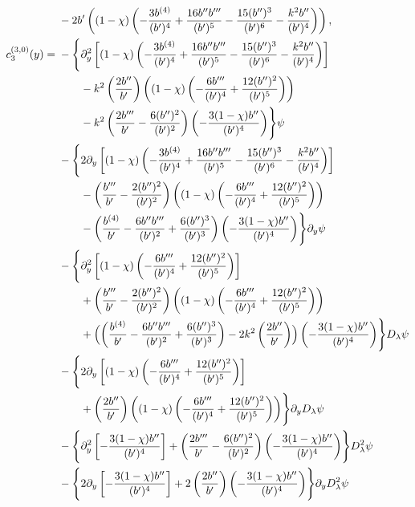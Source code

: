 \documentclass[reqno,11pt]{amsart}
\numberwithin{equation}{section}
\numberwithin{equation}{section} %
\begin{document}
\begin{enumerate}
\begin{align}
 &-2b'\left((1-\chi)\left(-\frac{3b^{(4)}}{(b')^4}+\frac{16b''b'''}{(b')^5}-\frac{15(b'')^3}{(b')^6}-\frac{k^2b''}{(b')^4}\right)\right), \notag\\
 c_3^{(3,0)}(y)
={}&-\Biggl\{\partial_y^2\left[(1-\chi)\left(-\frac{3b^{(4)}}{(b')^4}+\frac{16b''b'''}{(b')^5}-\frac{15(b'')^3}{(b')^6}-\frac{k^2b''}{(b')^4}\right)\right] \notag\\
 &\qquad-k^2\left(\frac{2b''}{b'}\right)\left((1-\chi)\left(-\frac{6b'''}{(b')^4}+\frac{12(b'')^2}{(b')^5}\right)\right) \notag\\
 &\qquad-k^2\left(\frac{2b'''}{b'}-\frac{6(b'')^2}{(b')^2}\right)\left(-\frac{3(1-\chi)b''}{(b')^4}\right)\Biggr\}\psi \notag\\
 &-\Biggl\{2\partial_y\left[(1-\chi)\left(-\frac{3b^{(4)}}{(b')^4}+\frac{16b''b'''}{(b')^5}-\frac{15(b'')^3}{(b')^6}-\frac{k^2b''}{(b')^4}\right)\right] \notag\\
 &\qquad-\left(\frac{b'''}{b'}-\frac{2(b'')^2}{(b')^2}\right)\left((1-\chi)\left(-\frac{6b'''}{(b')^4}+\frac{12(b'')^2}{(b')^5}\right)\right) \notag\\
 &\qquad-\left(\frac{b^{(4)}}{b'}-\frac{6b''b'''}{(b')^2}+\frac{6(b'')^3}{(b')^3}\right)\left(-\frac{3(1-\chi)b''}{(b')^4}\right)\Biggr\}\partial_y\psi \notag\\
 &-\Biggl\{\partial_y^2\left[(1-\chi)\left(-\frac{6b'''}{(b')^4}+\frac{12(b'')^2}{(b')^5}\right)\right] \notag\\
 &\qquad+\left(\frac{b'''}{b'}-\frac{2(b'')^2}{(b')^2}\right)\left((1-\chi)\left(-\frac{6b'''}{(b')^4}+\frac{12(b'')^2}{(b')^5}\right)\right) \notag\\
 &\qquad+\Bigl(\left(\frac{b^{(4)}}{b'}-\frac{6b''b'''}{(b')^2}+\frac{6(b'')^3}{(b')^3}\right)-2k^2\left(\frac{2b''}{b'}\right)\Bigr)\left(-\frac{3(1-\chi)b''}{(b')^4}\right)\Biggr\}D_\lambda\psi \notag\\
 &-\Biggl\{2\partial_y\left[(1-\chi)\left(-\frac{6b'''}{(b')^4}+\frac{12(b'')^2}{(b')^5}\right)\right] \notag\\
 &\qquad+\left(\frac{2b''}{b'}\right)\left((1-\chi)\left(-\frac{6b'''}{(b')^4}+\frac{12(b'')^2}{(b')^5}\right)\right)\Biggr\}\partial_yD_\lambda\psi \notag\\
 &-\Biggl\{\partial_y^2\left[-\frac{3(1-\chi)b''}{(b')^4}\right]+\left(\frac{2b'''}{b'}-\frac{6(b'')^2}{(b')^2}\right)\left(-\frac{3(1-\chi)b''}{(b')^4}\right)\Biggr\}D_\lambda^2\psi \notag\\
 &-\Biggl\{2\partial_y\left[-\frac{3(1-\chi)b''}{(b')^4}\right]+2\left(\frac{2b''}{b'}\right)\left(-\frac{3(1-\chi)b''}{(b')^4}\right)\Biggr\}\partial_yD_\lambda^2\psi \notag\\

\end{align}
\end{enumerate}
\end{document}
